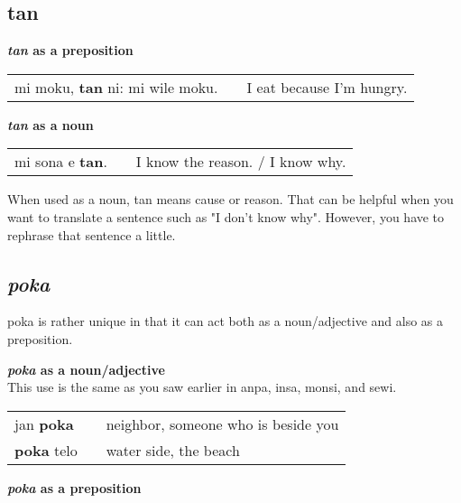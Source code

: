 \subsection*{tan}
\textbf{\textit{tan} as a preposition} 

\begin{supertabular}{p{5,5cm}|ll}
mi moku, \textbf{tan} ni: mi wile moku. &&  I eat because I'm hungry. \\
\end{supertabular} 

\textbf{\textit{tan} as a noun}

\begin{supertabular}{p{5,5cm}|ll}
mi sona e \textbf{tan}. && I know the reason. / I know why. \\
\end{supertabular} 
%
%

When used as a noun, tan means cause or reason. 
That can be helpful when you want to translate a sentence such as "I don't know why". 
However, you have to rephrase that sentence a little.
%
%
%
\subsection*{\textit{poka}}
%
poka is rather unique in that it can act both as a noun/adjective and also as a preposition. 

\textbf{\textit{poka} as a noun/adjective} \\
This use is the same as you saw earlier in anpa, insa, monsi, and sewi. 

\begin{supertabular}{p{5,5cm}|ll}
jan \textbf{poka} && neighbor, someone who is beside you \\
\textbf{poka} telo && water side, the beach \\
\end{supertabular} 

\textbf{\textit{poka} as a preposition} \\

